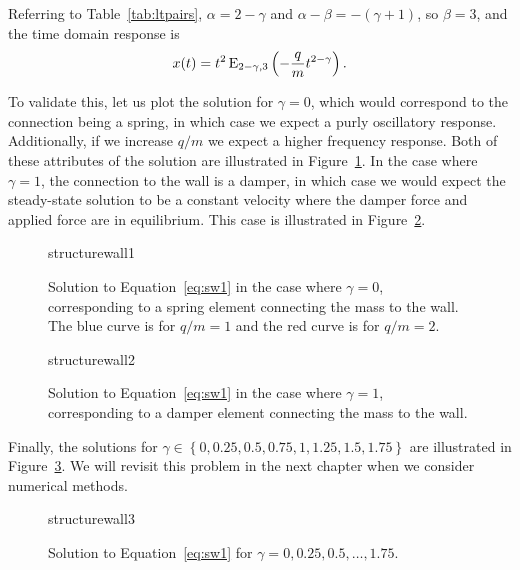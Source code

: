 \begin{example}
  Referring to Table~\ref{tab:ltpairs}, $\alpha =  2 - \gamma$ and $\alpha - \beta = - \left( \gamma + 1 \right)$, so $\beta = 3$, and the time domain response is
  \begin{equation*}
    x(t) = t^2 \operatorname{E}_{2-\gamma,3}\left(-\frac{q}{m} t^{2 - \gamma} \right).
  \end{equation*}
  
  To validate this, let us plot the solution for $\gamma = 0$, which would correspond to the connection being a spring, in which case we expect a purly oscillatory response. Additionally, if we increase $q/m$ we expect a higher frequency response. Both of these attributes of the solution are illustrated in Figure~\ref{fig:structurewall1}. In the case where $\gamma=1$, the connection to the wall is a damper, in which case we would expect the steady-state solution to be a constant velocity where the damper force and applied force are in equilibrium. This case is illustrated in Figure~\ref{fig:structurewall2}. 

  \begin{figure}
    \centering
    {structurewall1}
    \caption{Solution to Equation~\ref{eq:sw1} in the case where $\gamma=0$, corresponding to a spring element connecting the mass to the wall. The blue curve is for $q/m=1$ and the red curve is for $q/m=2$.}
    \label{fig:structurewall1}
  \end{figure}

  \begin{figure}
    \centering
    {structurewall2}
    \caption{Solution to Equation~\ref{eq:sw1} in the case where $\gamma=1$, corresponding to a damper element connecting the mass to the wall.}
    \label{fig:structurewall2}
  \end{figure}

  Finally, the solutions for $\gamma \in \left\{ 0, 0.25, 0.5, 0.75, 1, 1.25, 1.5, 1.75 \right\}$ are illustrated in Figure~\ref{fig:structurewall3}. We will revisit this problem in the next chapter when we consider numerical methods.

 \begin{figure}
    \centering
    {structurewall3}
    \caption{Solution to Equation~\ref{eq:sw1} for $\gamma = 0, 0.25, 0.5, \ldots, 1.75$. }
    \label{fig:structurewall3}
  \end{figure}



\end{example}
